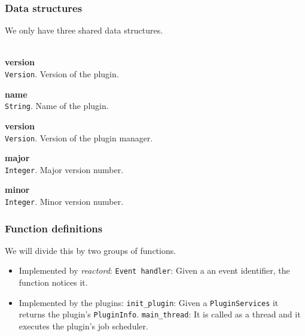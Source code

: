 \subsubsection{Data structures}
We only have three shared data structures.\\
\\
\begin{list}{-}{PluginInfo}
  \item {\bf version}\\
    \texttt{Version}. Version of the plugin.
  \item {\bf name}\\
    \texttt{String}. Name of the plugin.
\end{list}
\begin{list}{-}{PluginServices}
  \item {\bf version}\\
    \texttt{Version}. Version of the plugin manager.
\end{list}
\begin{list}{-}{Version}
  \item {\bf major}\\
    \texttt{Integer}. Major version number.
  \item {\bf minor}\\
    \texttt{Integer}. Minor version number.
\end{list}
\subsubsection{Function definitions}
We will divide this by two groups of functions.
\begin{itemize}
 \item Implemented by \emph{reactord}:
  \subitem \texttt{Event handler}: Given a an event identifier, the function notices it.
 \item Implemented by the plugins:
  \subitem \texttt{init\_plugin}: Given a \texttt{PluginServices} it returns the plugin's \texttt{PluginInfo}.
  \subitem \texttt{main\_thread}: It is called as a thread and it executes the plugin's job scheduler.
\end{itemize}
